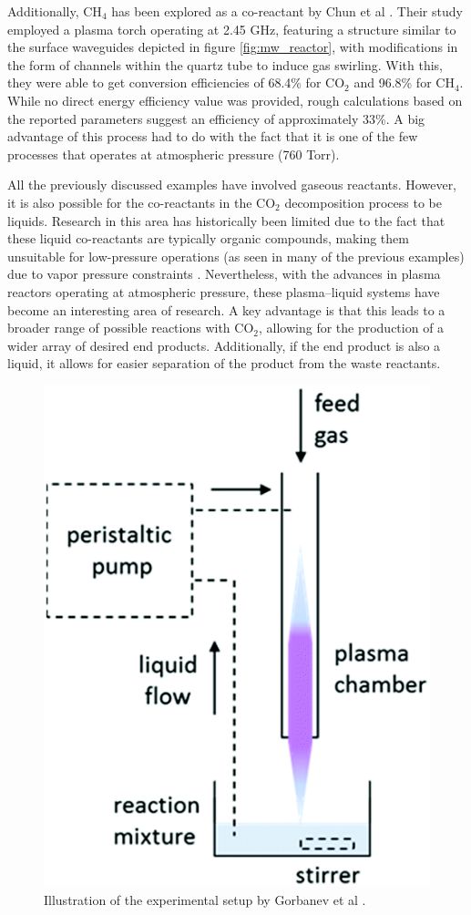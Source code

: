 Additionally, CH$_4$ has been explored as a co-reactant by Chun et al \cite{Chun2017}. Their study employed a plasma torch operating at 2.45 GHz, featuring a structure similar to the surface waveguides depicted in figure \ref{fig:mw_reactor}, with modifications in the form of channels within the quartz tube to induce gas swirling. With this, they were able to get conversion efficiencies of 68.4\% for CO$_2$ and 96.8\% for CH$_4$. While no direct energy efficiency value was provided, rough calculations based on the reported parameters suggest an efficiency of approximately 33\%. A big advantage of this process had to do with the fact that it is one of the few processes that operates at atmospheric pressure (760 Torr).

All the previously discussed examples have involved gaseous reactants. However, it is also possible for the co-reactants in the CO$_2$ decomposition process to be liquids. Research in this area has historically been limited due to the fact that these liquid co-reactants are typically organic compounds, making them unsuitable for low-pressure operations (as seen in many of the previous examples) due to vapor pressure constraints \cite{Bruggeman2016}. Nevertheless, with the advances in plasma reactors operating at atmospheric pressure, these plasma–liquid systems have become an interesting area of research. A key advantage is that this leads to a broader range of possible reactions with CO$_2$, allowing for the production of a wider array of desired end products. Additionally, if the end product is also a liquid, it allows for easier separation of the product from the waste reactants. 

\begin{figure}[h!]
	\centering
	\includegraphics[width=0.35\linewidth]{chapter_3/figures/rf_torch_with_liquid.png}
	\caption{Illustration of the experimental setup by Gorbanev et al \cite{Gorbanev2017}.}
	\label{fig:rf_torch_with_liquid}
\end{figure}


